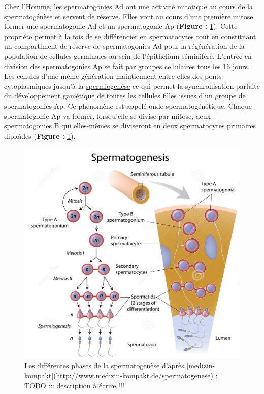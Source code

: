 \documentclass[12pt,twoside]{reedthesis}
\theoremstyle{definition}
\theoremstyle{definition}
\theoremstyle{remark}
\begin{document}
  Chez l'Homme, les spermatogonies Ad ont une activité mitotique au cours
  de la spermatogénèse et servent de réserve. Elles vont au cours d'une
  première mitose former une spermatogonie Ad et un spermatogonie Ap
  (\textbf{Figure :} \ref{fig:spermatogenese}). Cette propriété permet à
  la fois de se différencier en spermatocytes tout en constituant un
  compartiment de réserve de spermatogonies Ad pour la régénération de la
  population de cellules germinales au sein de l'épithélium séminifère.
  L'entrée en division des spermatogonies Ap se fait par groupes
  cellulaires tous les 16 jours. Les cellules d'une même génération
  maintiennent entre elles des ponts cytoplasmiques jusqu'à la
  \protect\hyperlink{spermiogenese}{spermiogenèse} ce qui permet la
  synchronisation parfaite du développement gamétique de toutes les
  cellules filles issues d'un groupe de spermatogonies Ap. Ce phénomène
  est appelé onde spermatogénétique. Chaque spermatogonie Ap va former,
  lorsqu'elle se divise par mitose, deux spermatogonies B qui elles-mêmes
  se diviseront en deux spermatocytes primaires diploïdes (\textbf{Figure
  :} \ref{fig:spermatogenese}).
  
  \newpage
  
  \begin{figure}
  
  {\centering \includegraphics[scale=0.35]{figure/spermatogenese2} 
  
  }
  
  \caption{Les différentes phases de la spermatogenèse d'après [medizin-kompakt](http://www.medizin-kompakt.de/spermatogenese) : TODO ::: description à écrire !!!}\label{fig:spermatogenese}
  \end{figure}
  
\end{document}
